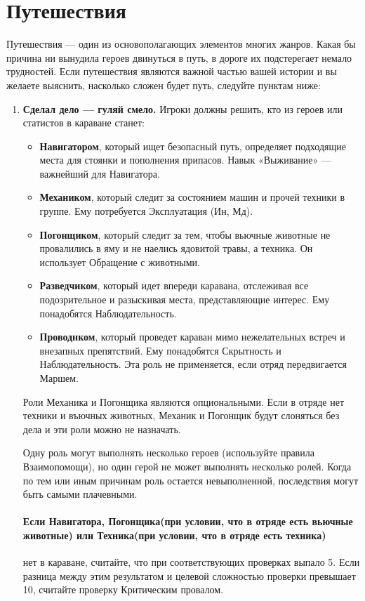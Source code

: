 \section{Путешествия}
Путешествия — один из основополагающих элементов многих жанров. Какая бы причина ни вынудила героев двинуться в путь, в дороге их подстерегает немало трудностей. Если путешествия являются важной частью вашей истории и вы желаете выяснить, насколько сложен будет путь, следуйте пунктам ниже:
\begin{enumerate}
\item \textbf{Сделал дело — гуляй смело.} Игроки должны решить, кто из героев или статистов в караване станет:
\begin{itemize}
\item \textbf{Навигатором}, который ищет безопасный путь, определяет подходящие места для стоянки и пополнения припасов. Навык «Выживание» — важнейший для Навигатора.
\item \textbf{Механиком}, который следит за состоянием машин и прочей техники в группе. Ему потребуется Эксплуатация (Ин, Мд).
\item \textbf{Погонщиком}, который следит за тем, чтобы вьючные животные не провалились в яму и не наелись ядовитой травы, а техника. Он использует Обращение с животными.
\item \textbf{Разведчиком}, который идет впереди каравана, отслеживая все подозрительное и разыскивая места, представляющие интерес. Ему понадобятся Наблюдательность.
\item \textbf{Проводнком}, который проведет караван мимо нежелательных встреч и внезапных препятствий. Ему понадобятся Скрытность и Наблюдательность. Эта роль не применяется, если отряд передвигается Маршем. 
\end{itemize}
\begin{tcolorbox}
Роли Механика и Погонщика являются опциональными. Если в отряде нет техники и въючных животных, Механик и Погонщик будут слоняться без дела и эти роли можно не назначать.
\end{tcolorbox}
Одну роль могут выполнять несколько героев (используйте правила Взаимопомощи), но один герой не может выполнять несколько ролей.
\newline
Когда по тем или иным причинам роль остается невыполненной, последствия могут быть самыми плачевными.
\paragraph{Если Навигатора, Погонщика(при условии, что в отряде есть вьючные животные) или Техника(при условии, что в отряде есть техника)} нет в караване, считайте, что при соответствующих проверках выпало 5. Если разница между этим результатом и целевой сложностью проверки превышает 10, считайте проверку Критическим провалом.

\end{enumerate}
